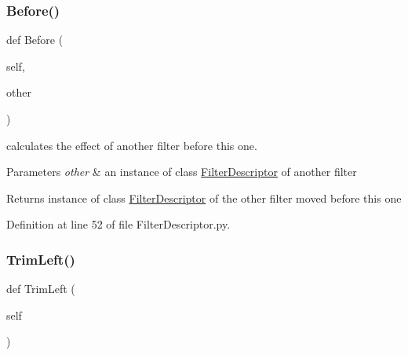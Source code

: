 \subsubsection{\texorpdfstring{Before()}{Before()}}
{\footnotesize\ttfamily def Before (\begin{DoxyParamCaption}\item[{}]{self,  }\item[{}]{other }\end{DoxyParamCaption})}



calculates the effect of another filter before this one. 


\begin{DoxyParams}{Parameters}
{\em other} & an instance of class \hyperlink{classSignalIntegrity_1_1TimeDomain_1_1Filters_1_1FilterDescriptor_1_1FilterDescriptor}{Filter\+Descriptor} of another filter \\
\hline
\end{DoxyParams}
\begin{DoxyReturn}{Returns}
instance of class \hyperlink{classSignalIntegrity_1_1TimeDomain_1_1Filters_1_1FilterDescriptor_1_1FilterDescriptor}{Filter\+Descriptor} of the other filter moved before this one 
\end{DoxyReturn}


Definition at line 52 of file Filter\+Descriptor.\+py.

\mbox{\label{classSignalIntegrity_1_1TimeDomain_1_1Filters_1_1FilterDescriptor_1_1FilterDescriptor_aa755b1fade9a131f66c5a448181a158e}} 
\subsubsection{\texorpdfstring{Trim\+Left()}{TrimLeft()}}
{\footnotesize\ttfamily def Trim\+Left (\begin{DoxyParamCaption}\item[{}]{self }\end{DoxyParamCaption})}



